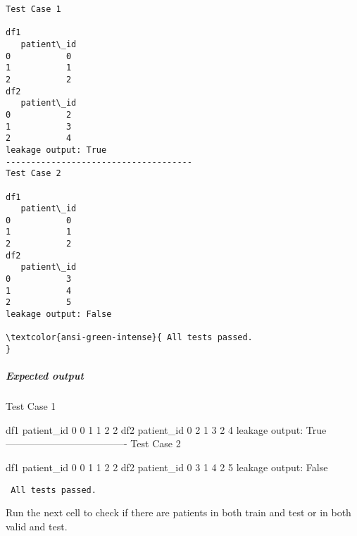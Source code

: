 \documentclass[11pt]{article}
\newenvironment{Shaded}{}{}
\newcommand{\DecValTok}[1]{\textcolor[rgb]{0.25,0.63,0.44}{{#1}}}
\newcommand{\NormalTok}[1]{{#1}}
\newcommand{\VariableTok}[1]{\textcolor[rgb]{0.10,0.09,0.49}{{#1}}}
\newcommand{\OperatorTok}[1]{\textcolor[rgb]{0.40,0.40,0.40}{{#1}}}
\begin{document}
    \begin{Verbatim}[commandchars=\\\{\}]
Test Case 1

df1
   patient\_id
0           0
1           1
2           2
df2
   patient\_id
0           2
1           3
2           4
leakage output: True 
-------------------------------------
Test Case 2

df1
   patient\_id
0           0
1           1
2           2
df2
   patient\_id
0           3
1           4
2           5
leakage output: False 

\textcolor{ansi-green-intense}{ All tests passed.
}
    \end{Verbatim}

    \hypertarget{expected-output}{%
\subparagraph{Expected output}\label{expected-output}}

\begin{Shaded}
\begin{Highlighting}[]
\NormalTok{Test Case }\DecValTok{1}

\NormalTok{df1}
\NormalTok{   patient_id}
\DecValTok{0}           \DecValTok{0}
\DecValTok{1}           \DecValTok{1}
\DecValTok{2}           \DecValTok{2}
\NormalTok{df2}
\NormalTok{   patient_id}
\DecValTok{0}           \DecValTok{2}
\DecValTok{1}           \DecValTok{3}
\DecValTok{2}           \DecValTok{4}
\NormalTok{leakage output: }\VariableTok{True} 
\OperatorTok{-------------------------------------}
\NormalTok{Test Case }\DecValTok{2}

\NormalTok{df1}
\NormalTok{   patient_id}
\DecValTok{0}           \DecValTok{0}
\DecValTok{1}           \DecValTok{1}
\DecValTok{2}           \DecValTok{2}
\NormalTok{df2}
\NormalTok{   patient_id}
\DecValTok{0}           \DecValTok{3}
\DecValTok{1}           \DecValTok{4}
\DecValTok{2}           \DecValTok{5}
\NormalTok{leakage output: }\VariableTok{False}
\end{Highlighting}
\end{Shaded}

\begin{verbatim}
 All tests passed.
\end{verbatim}

    Run the next cell to check if there are patients in both train and test
or in both valid and test.
\end{document}

